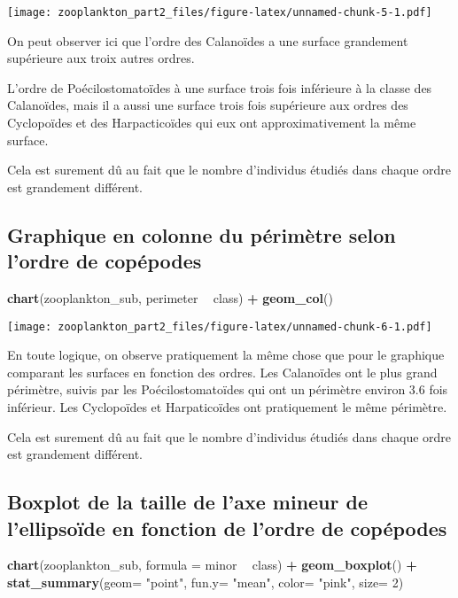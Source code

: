 \documentclass[]{article}
\newenvironment{Shaded}{\begin{snugshade}}{\end{snugshade}}
\newcommand{\KeywordTok}[1]{\textcolor[rgb]{0.13,0.29,0.53}{\textbf{#1}}}
\newcommand{\DataTypeTok}[1]{\textcolor[rgb]{0.13,0.29,0.53}{#1}}
\newcommand{\DecValTok}[1]{\textcolor[rgb]{0.00,0.00,0.81}{#1}}
\newcommand{\StringTok}[1]{\textcolor[rgb]{0.31,0.60,0.02}{#1}}
\newcommand{\OperatorTok}[1]{\textcolor[rgb]{0.81,0.36,0.00}{\textbf{#1}}}
\newcommand{\NormalTok}[1]{#1}
\begin{document}
\texttt{[image: zooplankton\_part2\_files/figure-latex/unnamed-chunk-5-1.pdf]}

On peut observer ici que l'ordre des Calanoïdes a une surface grandement
supérieure aux troix autres ordres.

L'ordre de Poécilostomatoïdes à une surface trois fois inférieure à la
classe des Calanoïdes, mais il a aussi une surface trois fois supérieure
aux ordres des Cyclopoïdes et des Harpacticoïdes qui eux ont
approximativement la même surface.

Cela est surement dû au fait que le nombre d'individus étudiés dans
chaque ordre est grandement différent.

\subsection{Graphique en colonne du périmètre selon l'ordre de
copépodes}\label{graphique-en-colonne-du-perimetre-selon-lordre-de-copepodes}

\begin{Shaded}
\begin{Highlighting}[]
\KeywordTok{chart}\NormalTok{(zooplankton_sub, perimeter }\OperatorTok{~}\StringTok{ }\NormalTok{class) }\OperatorTok{+}
\StringTok{  }\KeywordTok{geom_col}\NormalTok{()}
\end{Highlighting}
\end{Shaded}

\texttt{[image: zooplankton\_part2\_files/figure-latex/unnamed-chunk-6-1.pdf]}

En toute logique, on observe pratiquement la même chose que pour le
graphique comparant les surfaces en fonction des ordres. Les Calanoïdes
ont le plus grand périmètre, suivis par les Poécilostomatoïdes qui ont
un périmètre environ 3.6 fois inférieur. Les Cyclopoïdes et
Harpaticoïdes ont pratiquement le même périmètre.

Cela est surement dû au fait que le nombre d'individus étudiés dans
chaque ordre est grandement différent.

\subsection{Boxplot de la taille de l'axe mineur de l'ellipsoïde en
fonction de l'ordre de
copépodes}\label{boxplot-de-la-taille-de-laxe-mineur-de-lellipsoide-en-fonction-de-lordre-de-copepodes}

\begin{Shaded}
\begin{Highlighting}[]
\KeywordTok{chart}\NormalTok{(zooplankton_sub, }\DataTypeTok{formula =}\NormalTok{ minor }\OperatorTok{~}\StringTok{ }\NormalTok{class) }\OperatorTok{+}\StringTok{ }
\StringTok{  }\KeywordTok{geom_boxplot}\NormalTok{() }\OperatorTok{+}
\StringTok{  }\KeywordTok{stat_summary}\NormalTok{(}\DataTypeTok{geom=} \StringTok{"point"}\NormalTok{, }\DataTypeTok{fun.y=} \StringTok{"mean"}\NormalTok{, }\DataTypeTok{color=} \StringTok{"pink"}\NormalTok{, }\DataTypeTok{size=} \DecValTok{2}\NormalTok{) }
\end{Highlighting}
\end{Shaded}
\end{document}
